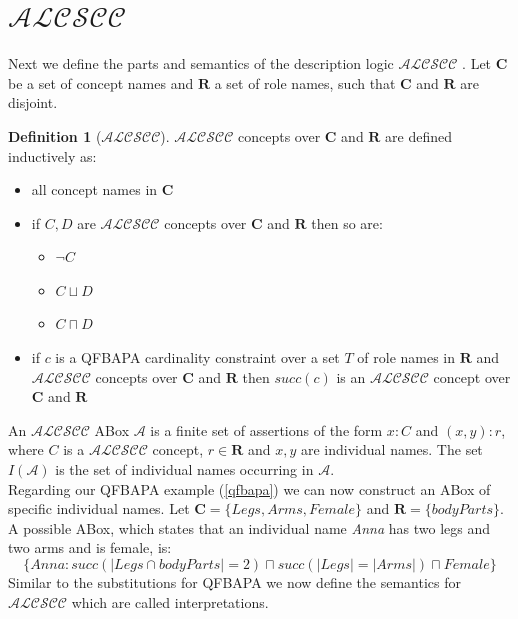 \documentclass{book}
\theoremstyle{break}
\theoremstyle{definition}
\newtheorem{mydef}{Definition}
\begin{document}
\section{$\mathcal{ALCSCC}$}
Next we define the parts and semantics of the description logic $\mathcal{ALCSCC}$ \cite{4}. Let $\mathbf{C}$ be a set of concept names and $\mathbf{R}$ a set of role names, such that $\mathbf{C}$ and $\mathbf{R}$ are disjoint.
\begin{mydef}[$\mathcal{ALCSCC}$]
$\mathcal{ALCSCC}$ concepts over $\mathbf{C}$ and $\mathbf{R}$ are defined inductively as:
\begin{itemize}
\item all concept names in $\mathbf{C}$
\item if $C,D$ are $\mathcal{ALCSCC}$ concepts over $\mathbf{C}$ and $\mathbf{R}$ then so are:
\begin{itemize}
\item $\neg C$
\item $C\sqcup D$ 
\item $C\sqcap D$
\end{itemize}
\item if $c$ is a QFBAPA cardinality constraint over a set $T$ of role names in $\mathbf{R}$ and $\mathcal{ALCSCC}$ concepts over $\mathbf{C}$ and $\mathbf{R}$ then $succ(c)$ is an $\mathcal{ALCSCC}$ concept over $\mathbf{C}$ and $\mathbf{R}$
\end{itemize}
\end{mydef}
An $\mathcal{ALCSCC}$ ABox $\mathcal{A}$ is a finite set of assertions of the form $x:C$ and $(x,y):r$, where $C$ is a $\mathcal{ALCSCC}$ concept, $r\in\mathbf{R}$ and $x,y$ are individual names. The set $I(\mathcal{A})$ is the set of individual names occurring in $\mathcal{A}$.\\
Regarding our QFBAPA example (\ref{qfbapa}) we can now construct an ABox of specific individual names. Let $\mathbf{C}=\{Legs, Arms, Female\}$ and $\mathbf{R}=\{bodyParts\}$. A possible ABox, which states that an individual name \textit{Anna} has two legs and two arms and is female, is:
\begin{equation}
\{Anna:succ(|Legs\cap bodyParts|=2)\sqcap succ(|Legs|=|Arms|)\sqcap Female\}
\end{equation}
Similar to the substitutions for QFBAPA we now define the semantics for $\mathcal{ALCSCC}$ which are called interpretations.
\end{document}
